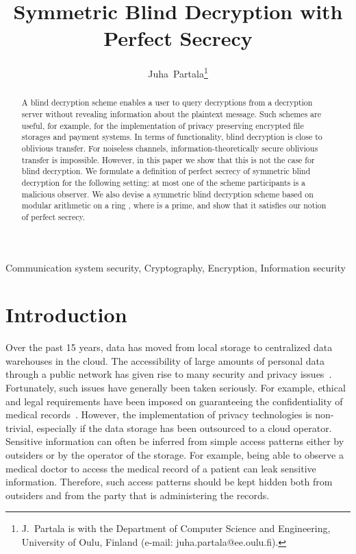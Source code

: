 \documentclass[10pt,journal]{IEEEtran}
\begin{document}
\title{Symmetric Blind Decryption with Perfect Secrecy}

\author{Juha~Partala\thanks{
J.~Partala is with the Department of Computer Science and Engineering, University of Oulu, Finland (e-mail: juha.partala@ee.oulu.fi).}}



\maketitle

\begin{abstract}
A blind decryption scheme 
enables a user to query decryptions from a decryption server without revealing
information about the plaintext message.
Such schemes are useful, for example, for the implementation of privacy preserving
encrypted file storages and
payment systems. 
In terms of functionality,
blind decryption is close to oblivious transfer.
For noiseless channels, information-theoretically secure oblivious transfer is impossible.
However, in this paper we show that this is not the case for blind decryption.
We formulate a definition of perfect secrecy of symmetric blind decryption for the following setting:
at most one of the scheme participants is a malicious observer.
We also devise a symmetric blind decryption scheme
based on modular arithmetic on a ring , where  is a prime,
and show that it satisfies our notion of perfect secrecy.
\end{abstract}

\begin{IEEEkeywords}
Communication system security, Cryptography, Encryption, Information security
\end{IEEEkeywords}





\section{Introduction}

Over the past 15 years, data has moved from local storage to
centralized data warehouses in the cloud.
The 
accessibility
of large amounts of personal data through a public network has given rise to
many security and privacy issues~\cite{Thuraisingham_2015}.
Fortunately, such issues have generally been taken seriously.
For example,
ethical and legal requirements have been imposed on guaranteeing
the confidentiality of medical records~\cite{HIPAA,DataProtDirective}.
However, the implementation of privacy technologies is non-trivial,
especially if the data storage has been outsourced to a cloud operator.
Sensitive information can often be inferred from simple access patterns either
by outsiders or by the operator of the storage.
For example, being able to observe a medical doctor
to access the medical record of a patient can leak sensitive information.
Therefore, such access patterns should be kept hidden both from
outsiders and from the party that is administering the records.
\end{document}
